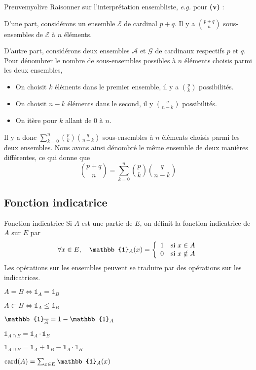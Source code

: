     \begin{demo}{Preuve}{myolive}
        Raisonner sur l’interprétation ensembliste, \textit{e.g.} pour \textbf{(v)} :

        D’une part, considérons un ensemble $\mathcal{E}$ de cardinal $p+q$. Il y a $\binom{p+q}{n}$ sous-ensembles de $\mathcal{E}$ à $n$ éléments. 

        D’autre part, considérons deux ensembles $\mathcal{A}$ et $\mathcal{G}$ de cardinaux respectifs $p$ et $q$. Pour dénombrer le nombre de sous-ensembles possibles à $n$ éléments choisis parmi les deux ensembles, 
        \begin{itemize}
            \item On choisit $k$ éléments dans le premier ensemble, il y a $\binom{p}{k}$ possibilités.
            \item On choisit $n-k$ éléments dans le second, il y $\binom{q}{n-k}$ possibilités.
            \item On itère pour $k$ allant de $0$ à $n$.
        \end{itemize}
        Il y a donc $\sum\limits_{k=0}^n \binom{p}{k} \binom{q}{n-k}$ sous-ensembles à $n$ éléments choisis parmi les deux ensembles. Nous avons ainsi dénombré le même ensemble de deux manières différentes, ce qui donne que 
        \[ \binom{p+q}{n} = \sum\limits_{k=0}^n \binom{p}{k} \binom{q}{n-k} \] 
    \end{demo}

    \subsection{Fonction indicatrice}

    \begin{defitheo}{Fonction indicatrice}{}
        Si $A$ est une partie de $E$, on définit la fonction indicatrice de $A$ sur $E$ par 
        \[ \forall x \in E, \quad \mathbb{1}_A(x) = \sisi{1}{x \in A}{0}{x \notin A} \]   
        Les opérations sur les ensembles peuvent se traduire par des opérations sur les indicatrices.
        \begin{enumerate}
            \begin{multicols}{2}
                \item $A = B \iff \mathbb{1}_A = \mathbb{1}_B$
                \item $A \subset B \iff \mathbb{1}_A \leq \mathbb{1}_B$ 
                \item $\mathbb{1}_{\ovl{A}} = 1 - \mathbb{1}_A$
                \item $\mathbb{1}_{A \cap B} = \mathbb{1}_A \cdotp \mathbb{1}_B$
                \item $\mathbb{1}_{A \cup B} = \mathbb{1}_A + \mathbb{1}_B - \mathbb{1}_A \cdotp \mathbb{1}_B$
                \item $\card(A)= \sum_{x \in E} \mathbb{1}_A(x)$
            \end{multicols}
        \end{enumerate}
    \end{defitheo}

